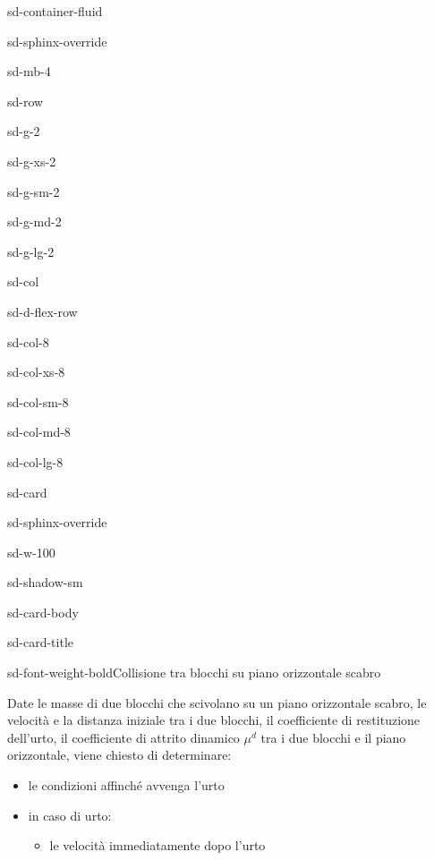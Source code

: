 \documentclass[letterpaper,10pt,italian]{jupyterBook}
\begin{document}
\begin{sphinxuseclass}{sd-container-fluid}
\begin{sphinxuseclass}{sd-sphinx-override}
\begin{sphinxuseclass}{sd-mb-4}
\begin{sphinxuseclass}{sd-row}
\begin{sphinxuseclass}{sd-g-2}
\begin{sphinxuseclass}{sd-g-xs-2}
\begin{sphinxuseclass}{sd-g-sm-2}
\begin{sphinxuseclass}{sd-g-md-2}
\begin{sphinxuseclass}{sd-g-lg-2}
\begin{sphinxuseclass}{sd-col}
\begin{sphinxuseclass}{sd-d-flex-row}
\begin{sphinxuseclass}{sd-col-8}
\begin{sphinxuseclass}{sd-col-xs-8}
\begin{sphinxuseclass}{sd-col-sm-8}
\begin{sphinxuseclass}{sd-col-md-8}
\begin{sphinxuseclass}{sd-col-lg-8}
\begin{sphinxuseclass}{sd-card}
\begin{sphinxuseclass}{sd-sphinx-override}
\begin{sphinxuseclass}{sd-w-100}
\begin{sphinxuseclass}{sd-shadow-sm}
\begin{sphinxuseclass}{sd-card-body}
\begin{sphinxuseclass}{sd-card-title}
\begin{sphinxuseclass}{sd-font-weight-bold}Collisione tra blocchi su piano orizzontale scabro
\end{sphinxuseclass}
\end{sphinxuseclass}
\sphinxAtStartPar
Date le masse di due blocchi che scivolano su un piano orizzontale scabro, le velocità e la distanza iniziale tra i due blocchi, il coefficiente di restituzione dell’urto, il coefficiente di attrito dinamico \(\mu^d\) tra i due blocchi e il piano orizzontale, viene chiesto di determinare:
\begin{itemize}
\item {} 
\sphinxAtStartPar
le condizioni affinché avvenga l’urto

\item {} 
\sphinxAtStartPar
in caso di urto:
\begin{itemize}
\item {} 
\sphinxAtStartPar
le velocità immediatamente dopo l’urto


\end{itemize}
\end{itemize}
\end{sphinxuseclass}
\end{sphinxuseclass}
\end{sphinxuseclass}
\end{sphinxuseclass}
\end{sphinxuseclass}
\end{sphinxuseclass}
\end{sphinxuseclass}
\end{sphinxuseclass}
\end{sphinxuseclass}
\end{sphinxuseclass}
\end{sphinxuseclass}
\end{sphinxuseclass}
\end{sphinxuseclass}
\end{sphinxuseclass}
\end{sphinxuseclass}
\end{sphinxuseclass}
\end{sphinxuseclass}
\end{sphinxuseclass}
\end{sphinxuseclass}
\end{sphinxuseclass}
\end{sphinxuseclass}
\end{document}
